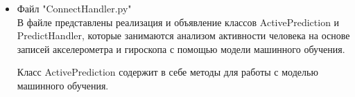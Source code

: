 \documentclass[a4document]{article}
\begin{document}
{\begin{itemize}
\begin{itemize}
                Закрывает Serial Port и останавливает передачу данных. \\
                Входные данные : функция принмает объект класса str. \\ 
                Выходные данные : функция не возвращает никаких параметров.
            \item Функция "getconditionthread" \\
                Возвращает состояние потока. \\
                Входные данные : функция не принимает никаких параметров. \\ 
                Выходные данные : функция переменную типа bool.
            \item Функция "setconditionthread" \\
                Изменяет состояние потока. \\
                Входные данные : функция принимает один параметр типа bool. \\ 
                Выходные данные : функция не возвращает никаких параметров.
        \end{itemize}
        
    \item Файл "ConnectHandler.py" \\
        В файле представлены реализация и объявление классов ActivePrediction и PredictHandler,  которые занимаются анализом активности человека на основе записей акселерометра и гироскопа с помощью модели машинного обучения.
        
        Класс ActivePrediction содержит в себе методы для работы с моделью машинного обучения.
        

\end{itemize}}
\end{document}
